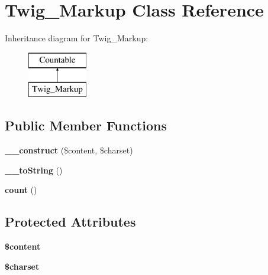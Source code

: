 \hypertarget{classTwig__Markup}{}\section{Twig\+\_\+\+Markup Class Reference}
\label{classTwig__Markup}
Inheritance diagram for Twig\+\_\+\+Markup\+:\begin{figure}[H]
\begin{center}
\leavevmode
\includegraphics[height=2.000000cm]{classTwig__Markup}
\end{center}
\end{figure}
\subsection*{Public Member Functions}
\begin{DoxyCompactItemize}
\item 
{\bfseries \+\_\+\+\_\+construct} (\$content, \$charset)\hypertarget{classTwig__Markup_ac7e18c4e8047b4fb79201a395b4ec4e0}{}\label{classTwig__Markup_ac7e18c4e8047b4fb79201a395b4ec4e0}

\item 
{\bfseries \+\_\+\+\_\+to\+String} ()\hypertarget{classTwig__Markup_a043ba4690f1f1fe172fe80eec44c11df}{}\label{classTwig__Markup_a043ba4690f1f1fe172fe80eec44c11df}

\item 
{\bfseries count} ()\hypertarget{classTwig__Markup_a8a033f48b93eb229a208dab8ef657da8}{}\label{classTwig__Markup_a8a033f48b93eb229a208dab8ef657da8}

\end{DoxyCompactItemize}
\subsection*{Protected Attributes}
\begin{DoxyCompactItemize}
\item 
{\bfseries \$content}\hypertarget{classTwig__Markup_a5188e6bf8a5761d29f17c915d07964ba}{}\label{classTwig__Markup_a5188e6bf8a5761d29f17c915d07964ba}

\item 
{\bfseries \$charset}\hypertarget{classTwig__Markup_ad8a27d7335f4fdbb49cc0dca3ea50893}{}\label{classTwig__Markup_ad8a27d7335f4fdbb49cc0dca3ea50893}

\end{DoxyCompactItemize}


